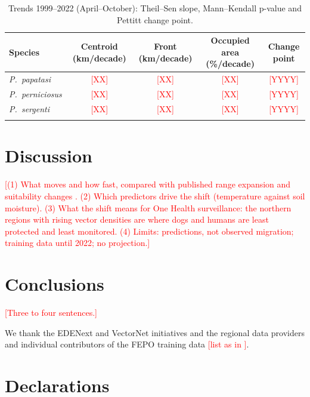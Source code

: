 \documentclass[pdflatex,sn-basic]{sn-jnl}
\newcommand{\todo}[1]{\textcolor{red}{[#1]}}
\newcommand{\spn}[1]{\textit{#1}}
\begin{document}
\begin{table}[t]
\caption{Trends 1999--2022 (April--October): Theil--Sen slope, Mann--Kendall p-value and Pettitt change point.}\label{tab:trends}
\begin{tabular}{@{}lcccc@{}}
\toprule
Species & Centroid (km/decade) & Front (km/decade) & Occupied area (\%/decade) & Change point \\
\midrule
\spn{P.~papatasi}    & \todo{XX} & \todo{XX} & \todo{XX} & \todo{YYYY} \\
\spn{P.~perniciosus} & \todo{XX} & \todo{XX} & \todo{XX} & \todo{YYYY} \\
\spn{P.~sergenti}    & \todo{XX} & \todo{XX} & \todo{XX} & \todo{YYYY} \\
\botrule
\end{tabular}
\end{table}

\section{Discussion}\label{sec:discussion}

\todo{(1) What moves and how fast, compared with published range expansion and suitability changes \citep{Carvalho2024, Wang2025}. (2) Which predictors drive the shift (temperature against soil moisture). (3) What the shift means for One Health surveillance: the northern regions with rising vector densities are where dogs and humans are least protected and least monitored. (4) Limits: predictions, not observed migration; training data until 2022; no projection.}

\section{Conclusions}\label{sec:conclusions}

\todo{Three to four sentences.}

\backmatter

 We thank the EDENext and VectorNet initiatives and the regional data providers and individual contributors of the FEPO training data \todo{list as in \citealp{Soheili2025}}.

\section*{Declarations}
\end{document}
